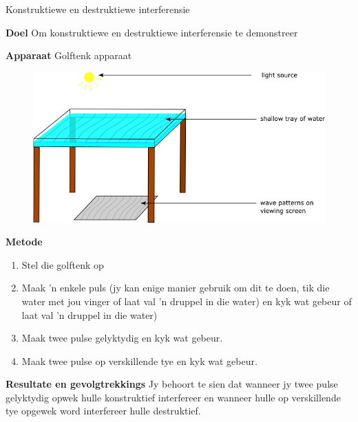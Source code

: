 	
\par
\label{m38802*eip-791}
\begin{g_experiment}{Konstruktiewe en destruktiewe interferensie}

\textbf{Doel}
Om konstruktiewe en destruktiewe interferensie te demonstreer
\par 
\label{m38802*eip7241}\noindent{}\textbf{Apparaat} 
Golftenk apparaat
	
\begin{figure}[H] %
    \begin{center}
    \label{m38802*id63458!!!underscore!!!media}\label{m38802*id63458!!!underscore!!!printimage}\includegraphics[width=0.8\columnwidth]{col11305.imgs/m38802_rippletray.png} %
      \vspace{2pt}
    \vspace{.1in}
    \end{center}
 \end{figure}       \par 
\textbf{Metode}
\begin{enumerate}[noitemsep, label=\textbf{\arabic*}. ] 
    \item Stel die golftenk op
    \item Maak 'n enkele puls (jy kan enige manier gebruik om dit te doen, tik die water met jou vinger of laat val 'n druppel in die water) en kyk wat gebeur of laat val 'n druppel in die water)
    \item Maak twee pulse gelyktydig en kyk wat gebeur.
    \item Maak twee pulse op verskillende tye en kyk wat gebeur.
\end{enumerate}    
\par 
\textbf{Resultate en gevolgtrekkings}
Jy behoort te sien dat wanneer jy twee pulse gelyktydig opwek hulle konstruktief interfereer en wanneer hulle op verskillende tye opgewek word interfereer hulle destruktief. 
\par 
\end{g_experiment}


